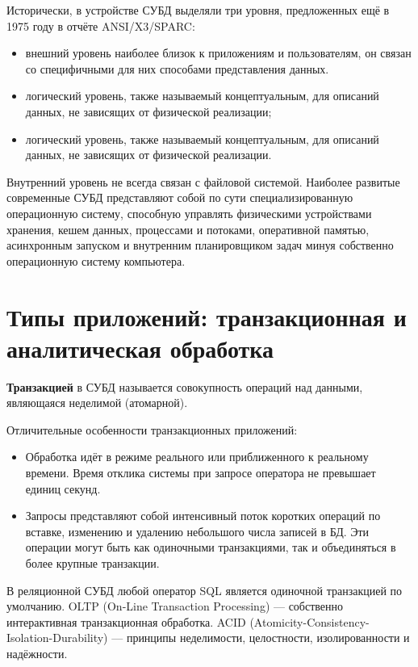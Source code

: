 \documentclass{beamer}
\begin{document}
\begin{frame}
Исторически, в устройстве СУБД выделяли три уровня, предложенных ещё в 1975 году в отчёте ANSI/X3/SPARC:
\begin{itemize}
\item внешний уровень наиболее близок к приложениям и пользователям, он связан со специфичными для них способами представления данных.
\item логический уровень, также называемый концептуальным, для описаний данных, не зависящих от физической реализации; 
\item логический уровень, также называемый концептуальным, для описаний данных, не зависящих от физической реализации.
\end{itemize}
Внутренний уровень не всегда связан с файловой системой. Наиболее развитые современные СУБД представляют собой по сути специализированную операционную систему, способную управлять
физическими устройствами хранения, кешем данных, процессами и потоками, оперативной памятью, асинхронным запуском и внутренним планировщиком задач минуя собственно операционную систему
компьютера.
\end{frame}

\section{Типы приложений: транзакционная и аналитическая обработка}
\begin{frame}
\textbf{Транзакцией} в СУБД называется совокупность операций над данными, являющаяся неделимой (атомарной).

Отличительные особенности транзакционных приложений:
\begin{itemize}
\item Обработка идёт в режиме реального или приближенного к реальному времени. Время отклика системы при запросе оператора не превышает единиц секунд.
\item Запросы представляют собой интенсивный поток коротких операций по вставке, изменению и удалению небольшого числа записей в БД. Эти операции могут быть как одиночными транзакциями, так и объединяться в более крупные транзакции.
\end{itemize}
В реляционной СУБД любой оператор SQL является одиночной транзакцией по умолчанию.
OLTP (On-Line Transaction Processing) — собственно интерактивная транзакционная обработка.
ACID (Atomicity-Consistency-Isolation-Durability) — принципы неделимости, целостности,
изолированности и надёжности.
\end{frame}
\end{document}
